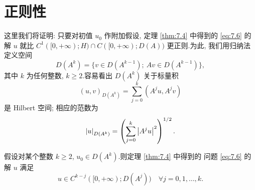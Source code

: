 \section{正则性}
\label{sec:7.3}

这里我们将证明: 只要对初值 $u_0$ 作附加假设, 定理  \ref{thm:7.4} 中得到的
\eqref{eq:7.6} 的解 $u$ 就比 $C^1([0,+\infty);H)\cap
C([0,+\infty);D(A))$ 更正则.为此, 我们用归纳法定义空间
\begin{equation*}
D(A^k)=\{v\in D(A^{k-1});\ Av\in D(A^{k-1})\},
\end{equation*}
其中 $k$ 为任何整数, $k\ge2$.容易看出 $D(A^k)$ 关于标量积
\begin{equation*}
(u,v)_{D(A^k)}=\sum_{j=0}^k(A^ju,A^jv)
\end{equation*}
是 Hilbert 空间; 相应的范数为
\begin{equation*}
\left|u\right|_{D(A^k)}=\left(\sum_{j=0}^k\left|A^ju\right|^2\right)^{1/2}.
\end{equation*}

\begin{theorem}
\label{thm:7.5}
假设对某个整数 $k\ge2$, $u_0\in D(A^k)$.则定理  \ref{thm:7.4} 中得到的
问题 \eqref{eq:7.6} 的解 $u$ 满足
\begin{equation*}
u\in C^{k-j}([0,+\infty);D(A^j))\quad\forall j=0,1,\dots,k.
\end{equation*}
\end{theorem}

